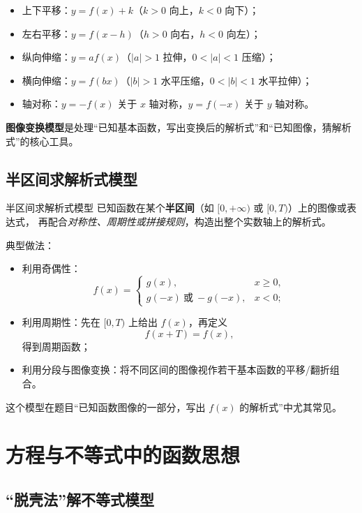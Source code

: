 \documentclass[a4paper,11pt]{ctexart}
\begin{document}
\begin{itemize}
  \item 上下平移：$y=f(x)+k$（$k>0$ 向上，$k<0$ 向下）；
  \item 左右平移：$y=f(x-h)$（$h>0$ 向右，$h<0$ 向左）；
  \item 纵向伸缩：$y=af(x)$（$|a|>1$ 拉伸，$0<|a|<1$ 压缩）；
  \item 横向伸缩：$y=f(bx)$（$|b|>1$ 水平压缩，$0<|b|<1$ 水平拉伸）；
  \item 轴对称：$y=-f(x)$ 关于 $x$ 轴对称，$y=f(-x)$ 关于 $y$ 轴对称。
\end{itemize}

\textbf{图像变换模型}是处理“已知基本函数，写出变换后的解析式”和“已知图像，猜解析式”的核心工具。

\subsection{半区间求解析式模型}

\begin{definitionbox}{半区间求解析式模型}
  已知函数在某个\textbf{半区间}（如 $[0,+\infty)$ 或 $[0,T)$）上的图像或表达式，
  再配合\emph{对称性、周期性或拼接规则}，构造出整个实数轴上的解析式。
\end{definitionbox}

典型做法：

\begin{itemize}
  \item 利用奇偶性：
    \[
      f(x)=
      \begin{cases}
        g(x), & x\ge0,\\
        g(-x)\ \text{或}\ -g(-x), & x<0;
      \end{cases}
    \]
  \item 利用周期性：先在 $[0,T)$ 上给出 $f(x)$，再定义
    \[
      f(x+T)=f(x),
    \]
    得到周期函数；
  \item 利用分段与图像变换：将不同区间的图像视作若干基本函数的平移/翻折组合。
\end{itemize}

这个模型在题目“已知函数图像的一部分，写出 $f(x)$ 的解析式”中尤其常见。

\section{方程与不等式中的函数思想}

\subsection{“脱壳法”解不等式模型}
\end{document}
